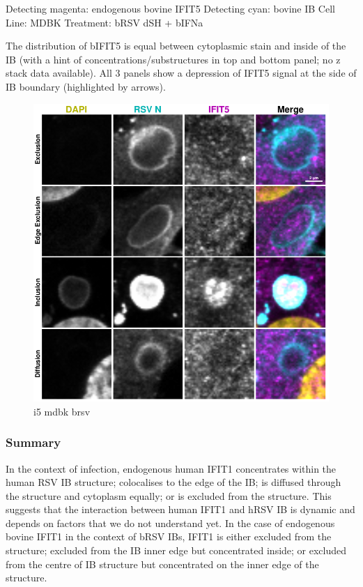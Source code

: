 Detecting magenta: endogenous bovine IFIT5 \newline
Detecting cyan: bovine IB \newline
Cell Line: MDBK \newline
Treatment: bRSV dSH + bIFNa \newline

The distribution of bIFIT5 is equal between cytoplasmic stain and inside of the IB (with a hint of concentrations/substructures in top and bottom panel; no z stack data available). All 3 panels show a depression of IFIT5 signal at the side of IB boundary (highlighted by arrows).

\begin{figure}
    \centering
    \includegraphics[width=1\linewidth]{09. Chapter 4/Figs/02. Infection/09. mdbk i5.pdf}
    \caption[i5 mdbk brsv]{i5 mdbk brsv}
    \label{fig:i5 mdbk brsv}
\end{figure}

\subsubsection{Summary} \label{Summary-infection}
In the context of infection, endogenous human IFIT1 concentrates within the human RSV IB structure; colocalises to the edge of the IB; is diffused through the structure and cytoplasm equally; or is excluded from the structure. This suggests that the interaction between human IFIT1 and hRSV IB is dynamic and depends on factors that we do not understand yet. In the case of endogenous bovine IFIT1 in the context of bRSV IBs, IFIT1 is either excluded from the structure; excluded from the IB inner edge but concentrated inside; or excluded from the centre of IB structure but concentrated on the inner edge of the structure. 


